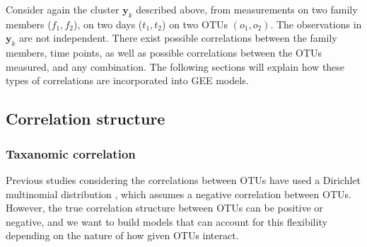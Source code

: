 \documentclass[12pt]{article}
\begin{document}
%
Consider again the cluster $\mathbf{y}_k$ described above, from measurements on two family members ($f_1,f_2$), on two days ($t_1, t_2$) on two OTUs $(o_1,o_2)$. The observations in $\mathbf{y}_k$ are not independent. There exist possible correlations between the family members, time points, as well as possible correlations between the OTUs measured, and any combination. The following sections will explain how these types of correlations are incorporated into GEE models.

\subsection{Correlation structure }
\subsubsection{Taxanomic correlation}
Previous studies considering the correlations between OTUs have used a Dirichlet multinomial distribution \cite{la2012hypothesis}, which assumes a negative correlation between OTUs. However, the true correlation structure between OTUs can be positive or negative\cite{mandal2015analysis}, and we want to build models that can account for this flexibility depending on the nature of how given OTUs interact.
\end{document}

